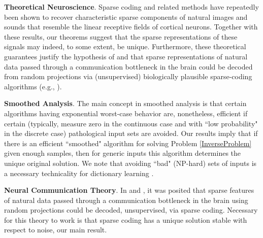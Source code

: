 \documentclass[journal, twocolumn]{IEEEtran}
\begin{document}
\textbf{Theoretical Neuroscience}.
Sparse coding and related methods have repeatedly been shown to recover characteristic sparse components of natural images \cite{Olshausen96, hurri1996image, bell1997independent, van1998independent} and sounds \cite{bellsejnowski1996, smithlewicki2006, Carlson12} that resemble the linear receptive fields of cortical neurons. Together with these results, our theorems suggest that the sparse representations of these signals may indeed, to some extent, be unique. Furthermore, these theoretical guarantees justify the hypothesis of \cite{Coulter10} and \cite{Isely10} that sparse representations of natural data passed through a communication bottleneck in the brain could be decoded from random projections via (unsupervised) biologically plausible sparse-coding algorithms (e.g., \cite{rozell2007neurally, hu2014hebbian}).   %



\textbf{Smoothed Analysis}.
The main concept in smoothed analysis \cite{Spielman04} is that certain algorithms having exponential worst-case behavior are, nonetheless, efficient if certain (typically, measure zero in the continuous case and with ``low probability" in the discrete case) pathological input sets are avoided. Our results imply that if there is an efficient ``smoothed" algorithm for solving Problem \ref{InverseProblem} given enough samples, then for generic inputs this algorithm determines the unique original solution. We note that avoiding ``bad" (NP-hard) sets of inputs is a necessary technicality for dictionary learning \cite{Razaviyayn15, Tillmann15}.

\textbf{Neural Communication Theory}.
In \cite{Coulter10} and \cite{Isely10}, it was posited that sparse features of natural data passed through a communication bottleneck in the brain using random projections could be decoded, unsupervised, via sparse coding.  Necessary for this theory to work is that sparse coding has a unique solution stable with respect to noise, our main result. 
\end{document}
